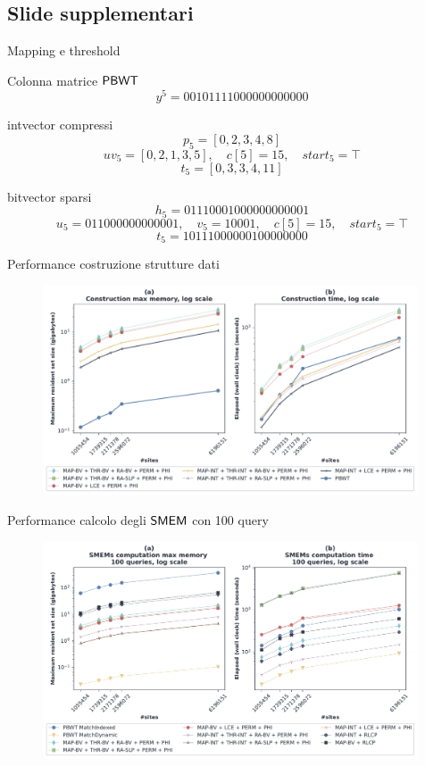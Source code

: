 \documentclass[]{beamer}
\def\PBWT{\mbox{\rm {\sf PBWT}}}
\def\SMEM{\mbox{\rm {\sf SMEM}}}
\begin{document}
\subsection{Slide supplementari}
\begin{frame}[plain]{Mapping e threshold}
  \begin{block}{Colonna matrice $\PBWT$}
    \[y^5=00101111000000000000\]
  \end{block}
  \begin{block}{intvector compressi}
    \[p_5=[0,2,3,4,8]\]
    \[uv_5=[0,2,1,3,5],\quad c[5]=15,\quad start_5=\top\]
    \[t_5=[0,3,3,4,11]\]
  \end{block}
  \begin{block}{bitvector sparsi}
    \[h_5=01110001000000000001\]
    \[u_5=011000000000001,\quad v_5=10001,\quad c[5]=15,\quad start_5=\top\]
    \[t_5=10111000000100000000\]
  \end{block}
\end{frame}
\begin{frame}[plain]{Performance costruzione strutture dati}
  \begin{figure}[H]
    \centering
    \includegraphics[width=0.99\textwidth]{img/make_time_mem_paper2.pdf}
  \end{figure}
\end{frame}
\begin{frame}[plain]{Performance calcolo degli $\SMEM$ con 100 query}
  \begin{figure}[H]
    \centering
    \includegraphics[width=0.99\textwidth]{img/exe_time_mem_paper.pdf}
  \end{figure}
\end{frame}
\end{document}
